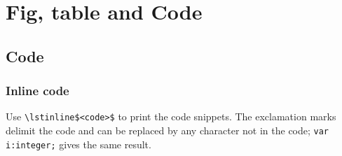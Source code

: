\chapter{Fig, table and Code}

\section{Code}

\subsection{Inline code}
Use \lstinline|\lstinline$<code>$| to print the code snippets. The exclamation marks delimit
the code and can be replaced by any character not in the code;
\lstinline|var i:integer;| gives the same result.
